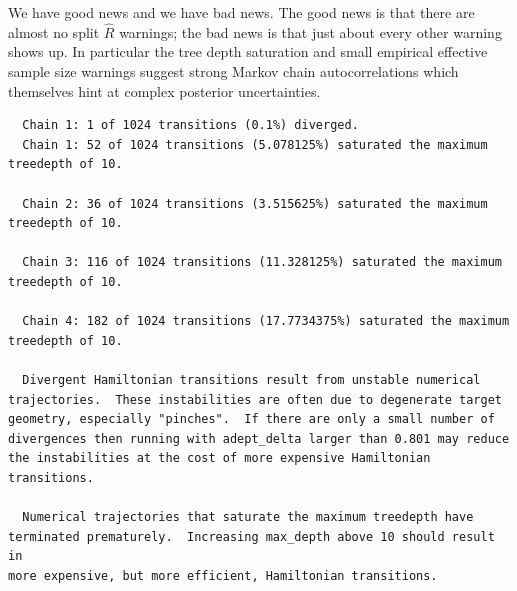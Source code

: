 \documentclass[
  letterpaper,
  DIV=11,
  numbers=noendperiod]{scrartcl}
\newenvironment{Shaded}{\begin{snugshade}}{\end{snugshade}}
\newcommand{\AttributeTok}[1]{\textcolor[rgb]{0.40,0.45,0.13}{#1}}
\newcommand{\DecValTok}[1]{\textcolor[rgb]{0.68,0.00,0.00}{#1}}
\newcommand{\FunctionTok}[1]{\textcolor[rgb]{0.28,0.35,0.67}{#1}}
\newcommand{\NormalTok}[1]{\textcolor[rgb]{0.00,0.23,0.31}{#1}}
\newcommand{\OtherTok}[1]{\textcolor[rgb]{0.00,0.23,0.31}{#1}}
\newcommand{\SpecialCharTok}[1]{\textcolor[rgb]{0.37,0.37,0.37}{#1}}
\newcommand{\StringTok}[1]{\textcolor[rgb]{0.13,0.47,0.30}{#1}}
\begin{document}
\begin{Shaded}
\end{Shaded}

We have good news and we have bad news. The good news is that there are
almost no split \(\hat{R}\) warnings; the bad news is that just about
every other warning shows up. In particular the tree depth saturation
and small empirical effective sample size warnings suggest strong Markov
chain autocorrelations which themselves hint at complex posterior
uncertainties.

\begin{Shaded}
\end{Shaded}

\begin{verbatim}
  Chain 1: 1 of 1024 transitions (0.1%) diverged.
  Chain 1: 52 of 1024 transitions (5.078125%) saturated the maximum treedepth of 10.

  Chain 2: 36 of 1024 transitions (3.515625%) saturated the maximum treedepth of 10.

  Chain 3: 116 of 1024 transitions (11.328125%) saturated the maximum treedepth of 10.

  Chain 4: 182 of 1024 transitions (17.7734375%) saturated the maximum treedepth of 10.

  Divergent Hamiltonian transitions result from unstable numerical
trajectories.  These instabilities are often due to degenerate target
geometry, especially "pinches".  If there are only a small number of
divergences then running with adept_delta larger than 0.801 may reduce
the instabilities at the cost of more expensive Hamiltonian
transitions.

  Numerical trajectories that saturate the maximum treedepth have
terminated prematurely.  Increasing max_depth above 10 should result in
more expensive, but more efficient, Hamiltonian transitions.
\end{verbatim}
\end{document}
